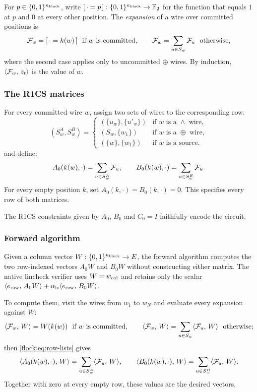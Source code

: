For $p\in\{0,1\}^{\kappa_{\mathrm{block}}}$, write $[\,\cdot=p\,]:\{0,1\}^{\kappa_{\mathrm{block}}}\to\mathbb{F}_2$ for the function that equals $1$ at $p$ and $0$ at every other position. The \emph{expansion} of a wire over committed positions is
\begin{equation}\label{flock:eq:expand}
\mathcal{F}_{w}=[\,\cdot=k(w)\,]\ \text{ if $w$ is committed},\qquad \mathcal{F}_{w}=\sum_{u\in S_w}\mathcal{F}_{u}\ \text{ otherwise},
\end{equation}
where the second case applies only to uncommitted $\oplus$ wires. By induction, $\langle \mathcal{F}_{w},\, z_t \rangle$ is the value of $w$.

\subsubsection{The R1CS matrices}\label{flock:rows}

For every committed wire $w$, assign two sets of wires to the corresponding row:
\[
(S^A_w,S^B_w)=
\begin{cases}
(\{u_w\},\{u'_w\}) & \text{if $w$ is a $\wedge$ wire},\\
(S_w,\{w_1\}) & \text{if $w$ is a $\oplus$ wire},\\
(\{w\},\{w_1\}) & \text{if $w$ is a source}.
\end{cases}
\]
and define:
\begin{equation}\label{flock:eq:row-lists}
A_0(k(w),\cdot)=\sum_{u\in S^A_w}\mathcal{F}_{u},\qquad B_0(k(w),\cdot)=\sum_{u\in S^B_w}\mathcal{F}_{u}.
\end{equation}
For every empty position $k$, set $A_0(k,\cdot)=B_0(k,\cdot)=0$. This specifies every row of both matrices.

\vspace{3mm}

The R1CS constraints given by $A_0$, $B_0$ and $C_0=I$ faithfully encode the circuit.
\subsubsection{Forward algorithm}\label{flock:forward}

Given a column vector $W:\{0,1\}^{\kappa_{\mathrm{block}}}\to E$, the forward algorithm computes the two row-indexed vectors $A_0W$ and $B_0W$ without constructing either matrix. The native lincheck verifier uses $W=w_{\mathrm{col}}$ and retains only the scalar $\langle e_{\mathrm{row}},\, A_0W \rangle+\alpha_{\mathrm{lc}}\langle e_{\mathrm{row}},\, B_0W \rangle$.

To compute them, visit the wires from $w_1$ to $w_N$ and evaluate every expansion against $W$:
\[
\langle \mathcal{F}_{w},\, W \rangle=W(k(w))\ \text{ if $w$ is committed},\qquad \langle \mathcal{F}_{w},\, W \rangle=\sum_{u\in S_w}\langle \mathcal{F}_{u},\, W \rangle\ \text{ otherwise};
\]
then \eqref{flock:eq:row-lists} gives
\begin{equation}\label{flock:eq:row-pair}
\langle A_0(k(w),\cdot),\, W \rangle=\sum_{u\in S^A_w}\langle \mathcal{F}_{u},\, W \rangle,\qquad \langle B_0(k(w),\cdot),\, W \rangle=\sum_{u\in S^B_w}\langle \mathcal{F}_{u},\, W \rangle.
\end{equation}
Together with zero at every empty row, these values are the desired vectors.

